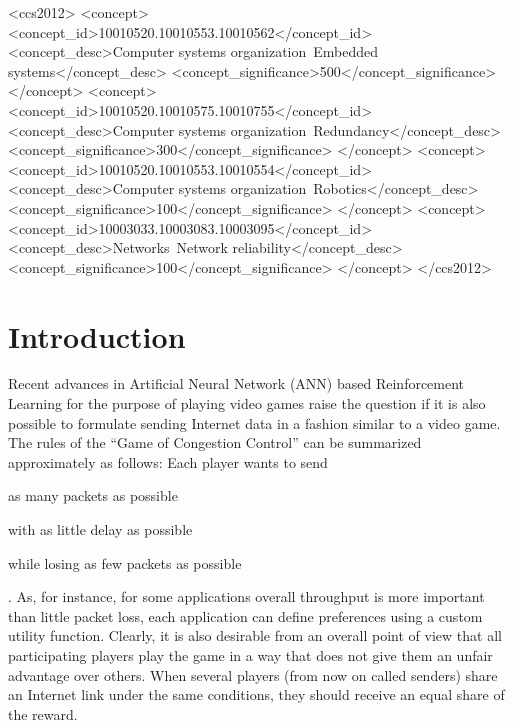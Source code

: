 \documentclass[sigconf]{acmart}
\begin{document}
%
%
\begin{CCSXML}
<ccs2012>
 <concept>
  <concept_id>10010520.10010553.10010562</concept_id>
  <concept_desc>Computer systems organization~Embedded systems</concept_desc>
  <concept_significance>500</concept_significance>
 </concept>
 <concept>
  <concept_id>10010520.10010575.10010755</concept_id>
  <concept_desc>Computer systems organization~Redundancy</concept_desc>
  <concept_significance>300</concept_significance>
 </concept>
 <concept>
  <concept_id>10010520.10010553.10010554</concept_id>
  <concept_desc>Computer systems organization~Robotics</concept_desc>
  <concept_significance>100</concept_significance>
 </concept>
 <concept>
  <concept_id>10003033.10003083.10003095</concept_id>
  <concept_desc>Networks~Network reliability</concept_desc>
  <concept_significance>100</concept_significance>
 </concept>
</ccs2012>  
\end{CCSXML}





\maketitle%

\section{Introduction}

Recent advances in Artificial Neural Network (ANN) based Reinforcement Learning for the purpose of playing video games raise the question if it is also possible to formulate sending Internet data in a fashion similar to a video game. The rules of the ``Game of Congestion Control'' can be summarized approximately as follows: Each player wants to send \begin{enumerate*}
\item as many packets as possible
\item with as little delay as possible
\item while losing as few packets as possible
\end{enumerate*}. As, for instance, for some applications overall throughput is more important than little packet loss, each application can define preferences using a custom utility function. Clearly, it is also desirable from an overall point of view that all participating players play the game in a way that does not give them an unfair advantage over others. When several players (from now on called senders) share an Internet link under the same conditions, they should receive an equal share of the reward. 
\end{document}
